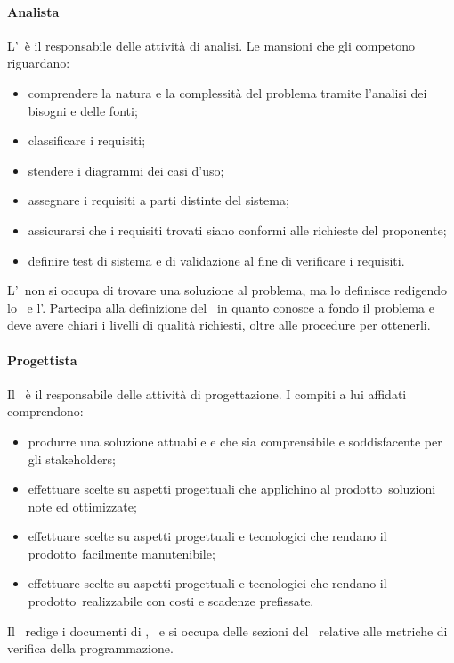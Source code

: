 \documentclass[../NormeProgetto.tex]{subfiles}
\begin{document}
		\paragraph{Analista}
			L'\analista\ è il responsabile delle attività di analisi. Le mansioni che gli competono riguardano:
			\begin{itemize}
				\item comprendere la natura e la complessità del problema tramite l'analisi dei bisogni e delle fonti;
				\item classificare i requisiti;
				\item stendere i diagrammi dei casi d'uso;
				\item assegnare i requisiti a parti distinte del sistema;
				\item assicurarsi che i requisiti trovati siano conformi alle richieste del proponente;
				\item definire test di sistema e di validazione al fine di verificare i requisiti.
			\end{itemize}
			L'\analista\ non si occupa di trovare una soluzione al problema, ma lo definisce redigendo lo \studiodifattibilita\ e l'\analisideirequisiti. Partecipa alla definizione del \pianodiqualifica\ in quanto conosce a fondo il problema e deve avere chiari i livelli di qualità richiesti, oltre alle procedure per ottenerli. 
		\paragraph{Progettista}
			Il \progettista\ è il responsabile delle attività di progettazione. I compiti a lui affidati comprendono:
			\begin{itemize}
				\item produrre una soluzione attuabile e che sia comprensibile e soddisfacente per gli stakeholders;
				\item effettuare scelte su aspetti progettuali che applichino al prodotto\g\ soluzioni note ed ottimizzate;
				\item effettuare scelte su aspetti progettuali e tecnologici che rendano il prodotto\g\ facilmente manutenibile;
				\item effettuare scelte su aspetti progettuali e tecnologici che rendano il prodotto\g\ realizzabile con costi e scadenze prefissate.
			\end{itemize}
			Il \progettista\ redige i documenti di \specificatecnica, \ e si occupa delle sezioni del \pianodiqualifica\ relative alle metriche di verifica della programmazione.
\end{document}
